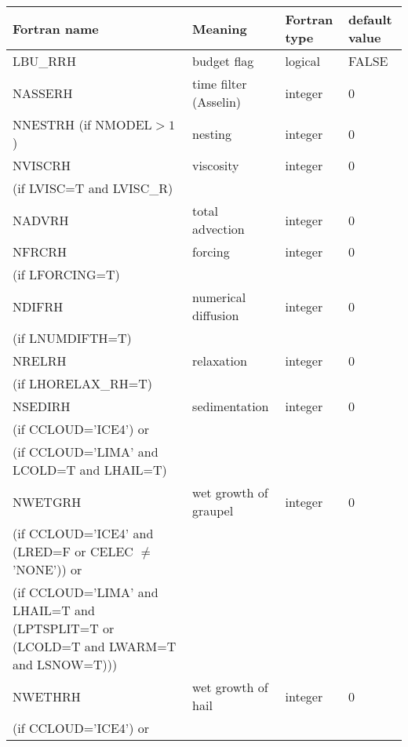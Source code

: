 \begin{longtable} {|p{}|p{}|>{\centering}p{}|p{}<{\centering}|}
\hline
Fortran name & Meaning & Fortran type & default value \\
\hline \hline
\endhead
LBU\_RRH & budget flag & logical & FALSE\index{LBU\_RRH!\innam{NAM\_BU\_RRH}} \\\hline
NASSERH  & time filter (Asselin)   & integer  &  0 \index{NASSERH!\innam{NAM\_BU\_RRH}} \\\hline
NNESTRH (if NMODEL$>1$) & nesting           & integer  &  0 \index{NNESTRH!\innam{NAM\_BU\_RRH}} \\\hline
NVISCRH  & viscosity         & integer  &  0 \index{NVISCRH!\innam{NAM\_BU\_RRH}}\\
(if LVISC=T and LVISC\_R) &  &   &   \\\hline
NADVRH   & total advection   & integer  &  0 \index{NADVRH!\innam{NAM\_BU\_RRH}}\\\hline
NFRCRH   & forcing           & integer  &  0 \index{NFRCRH!\innam{NAM\_BU\_RRH}} \\ \nopagebreak
(if LFORCING=T) &  &   &   \\\hline
NDIFRH   & numerical diffusion & integer  &  0 \index{NDIFRH!\innam{NAM\_BU\_RRH}} \\ \nopagebreak
(if LNUMDIFTH=T) &  &   &   \\\hline
NRELRH   & relaxation        & integer  &  0 \index{NRELRH!\innam{NAM\_BU\_RRH}}\\ \nopagebreak
(if LHORELAX\_RH=T) &  &   &   \\\hline
NSEDIRH  & sedimentation    & integer  &  0 \index{NSEDIRH!\innam{NAM\_BU\_RRH}}\\ \nopagebreak
(if CCLOUD='ICE4') or & &   &  \\ \nopagebreak
(if CCLOUD='LIMA' and LCOLD=T and LHAIL=T) & &   &  \\\hline
NWETGRH  & wet growth of graupel  & integer  &  0 \index{NWETGRH!\innam{NAM\_BU\_RRH}}\\ \nopagebreak
(if CCLOUD='ICE4' and (LRED=F or CELEC $\neq$ 'NONE')) or & &   &  \\
(if CCLOUD='LIMA' and LHAIL=T and (LPTSPLIT=T or (LCOLD=T and LWARM=T and LSNOW=T))) & &   &  \\\hline
NWETHRH  & wet growth of hail  & integer  &  0 \index{NWETHRH!\innam{NAM\_BU\_RRH}}\\ \nopagebreak
(if CCLOUD='ICE4') or & &   &  \\

\end{longtable}
